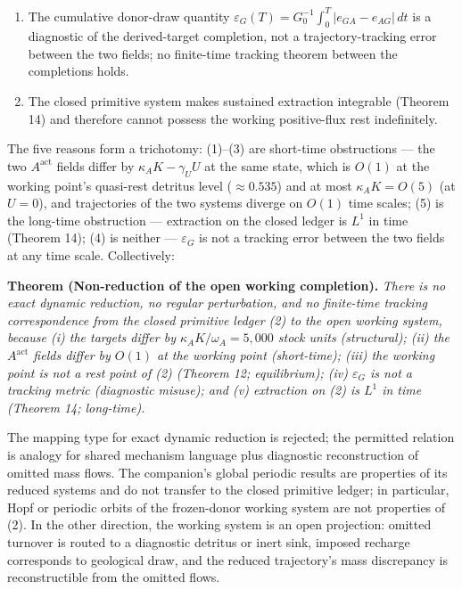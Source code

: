 \documentclass[11pt]{article}
\begin{document}
\begin{enumerate}
  figures \(E^* \approx 2.090\), \(N^* = 89.526\),
  \(A^{\mathrm{act,*}} = 397.87\), and the recharge \(4.652\) are
  imported at the companion's registered precision; the reverse check
  \(qE^*N^* = 0.001 \times 2.090 \times 89.526 \approx 0.187\) is
  consistent to the quoted digits.
\item
  The cumulative donor-draw quantity
  \(\varepsilon_G(T) = G_0^{-1}\int_0^T |e_{GA} - e_{AG}|\, dt\) is a
  diagnostic of the derived-target completion, not a trajectory-tracking
  error between the two fields; no finite-time tracking theorem between
  the completions holds.
\item
  The closed primitive system makes sustained extraction integrable
  (Theorem 14) and therefore cannot possess the working positive-flux
  rest indefinitely.
\end{enumerate}

The five reasons form a trichotomy: (1)--(3) are short-time obstructions
--- the two \(A^{\mathrm{act}}\) fields differ by
\(\kappa_A K - \gamma_U U\) at the same state, which is \(O(1)\) at the
working point's quasi-rest detritus level (\(\approx 0.535\)) and at
most \(\kappa_A K = O(5)\) (at \(U = 0\)), and trajectories of the two
systems diverge on \(O(1)\) time scales; (5) is the long-time
obstruction --- extraction on the closed ledger is \(L^1\) in time
(Theorem 14); (4) is neither --- \(\varepsilon_G\) is not a tracking
error between the two fields at any time scale. Collectively:

\textbf{Theorem (Non-reduction of the open working completion).}
\emph{There is no exact dynamic reduction, no regular perturbation, and
no finite-time tracking correspondence from the closed primitive ledger
(2) to the open working system, because (i) the targets differ by
\(\kappa_A K/\omega_A = 5{,}000\) stock units (structural); (ii) the
\(A^{\mathrm{act}}\) fields differ by \(O(1)\) at the working point
(short-time); (iii) the working point is not a rest point of (2)
(Theorem 12; equilibrium); (iv) \(\varepsilon_G\) is not a tracking
metric (diagnostic misuse); and (v) extraction on (2) is \(L^1\) in time
(Theorem 14; long-time).}

The mapping type for exact dynamic reduction is rejected; the permitted
relation is analogy for shared mechanism language plus diagnostic
reconstruction of omitted mass flows. The companion's global periodic
results are properties of its reduced systems and do not transfer to the
closed primitive ledger; in particular, Hopf or periodic orbits of the
frozen-donor working system are not properties of (2). In the other
direction, the working system is an open projection: omitted turnover is
routed to a diagnostic detritus or inert sink, imposed recharge
corresponds to geological draw, and the reduced trajectory's mass
discrepancy is reconstructible from the omitted flows.
\end{document}
